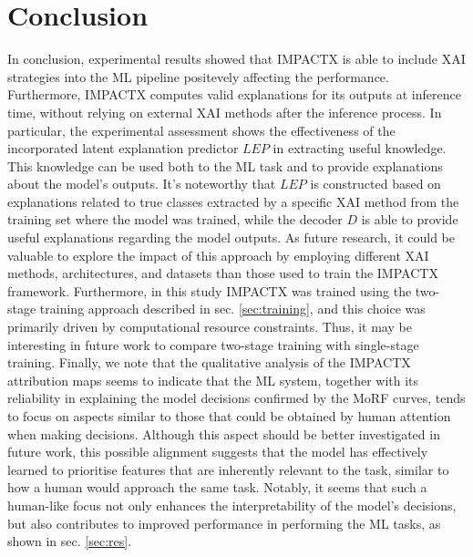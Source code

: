 \section{Conclusion}
\label{sec:conclusion}


In conclusion, experimental results showed that IMPACTX is able to include XAI strategies into the ML pipeline positevely affecting the performance. Furthermore, IMPACTX computes valid explanations for its outputs at inference time, without relying on external XAI methods after the inference process. In particular, the experimental assessment shows the  effectiveness of the incorporated latent explanation predictor $LEP$ in extracting useful knowledge. This knowledge can be used both to the ML task and to provide explanations about the model's outputs. It's noteworthy that $LEP$ is constructed based on explanations related to true classes extracted by a specific XAI method from the training set where the model was trained, while the decoder $D$ is able to provide useful explanations regarding the model outputs. As future research, it could be valuable to explore the impact of this approach by employing different XAI methods, architectures, and datasets than those used to train the IMPACTX framework.  Furthermore, in this study IMPACTX was trained using the two-stage training approach described in sec. \ref{sec:training}, and this choice was primarily driven by computational resource constraints. Thus, it may be interesting in future work to compare two-stage training with single-stage training. 
Finally, we note that the qualitative analysis of the IMPACTX attribution maps seems to indicate that the ML system, together with its reliability in explaining the model decisions confirmed by the MoRF curves, tends to focus on aspects similar to those that could be obtained by human attention when making decisions. 
Although this aspect should be better investigated in future work, this possible alignment suggests that the model has effectively learned to prioritise features that are inherently relevant to the task, similar to how a human would approach the same task. Notably, it seems that such a human-like focus not only enhances the interpretability of the model's decisions, but also contributes to improved performance in performing the ML tasks, as shown in sec. \ref{sec:res}. 